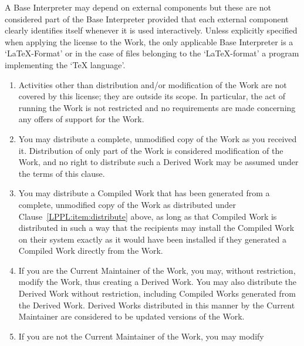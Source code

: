 \begin{LPPLicense}
\begin{description}
            A Base Interpreter may depend on external components but these are
            not considered part of the Base Interpreter provided that each
            external component clearly identifies itself whenever it is used
            interactively.  Unless explicitly specified when applying the
            license to the Work, the only applicable Base Interpreter is a
            `\LaTeX-Format' or in the case of files belonging to the
            `\LaTeX-format' a program implementing the `\TeX{} language'.
    \end{description}


    \label{LPPL:Conditions}

    \begin{enumerate}
        \item Activities other than distribution and/or modification of the
            Work are not covered by this license; they are outside its scope.
            In particular, the act of running the Work is not restricted and
            no requirements are made concerning any offers of support for the
            Work.
        \item\label{LPPL:item:distribute} You may distribute a complete,
            unmodified copy of the Work as you received it.  Distribution of
            only part of the Work is considered modification of the Work, and
            no right to distribute such a Derived Work may be assumed under the
            terms of this clause.
        \item You may distribute a Compiled Work that has been generated from
            a complete, unmodified copy of the Work as distributed under
            Clause~\ref{LPPL:item:distribute} above, as long as that Compiled
            Work is distributed in such a way that the recipients may install
            the Compiled Work on their system exactly as it would have been
            installed if they generated a Compiled Work directly from the Work.
        \item\label{LPPL:item:currmaint} If you are the Current Maintainer of
            the Work, you may, without restriction, modify the Work, thus
            creating a Derived Work.  You may also distribute the Derived Work
            without restriction, including Compiled Works generated from the
            Derived Work.  Derived Works distributed in this manner by the
            Current Maintainer are considered to be updated versions of the
            Work.
        \item If you are not the Current Maintainer of the Work, you may modify

\end{enumerate}
\end{LPPLicense}

